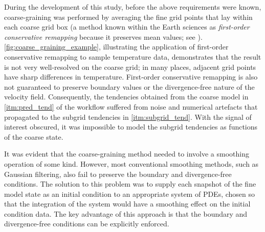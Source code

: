 \documentclass[../main.tex]{subfiles}
\begin{document}
During the development of this study, before the above requirements were known,
coarse-graining was performed by averaging the fine grid points that lay within
each coarse grid box (a method known within the Earth sciences as
\emph{first-order conservative remapping} because it preserves mean values; see
\cite{jones1999}). \cref{fig:coarse_graining_example}, illustrating the
application of first-order conservative remapping to sample temperature data,
demonstrates that the result is not very well-resolved on the coarse grid; in
many places, adjacent grid points have sharp differences in temperature.
First-order conservative remapping is also not guaranteed to preserve boundary
values or the divergence-free nature of the velocity field. Consequently, the
tendencies obtained from the coarse model in \cref{itm:pred_tend} of the
workflow suffered from noise and numerical artefacts that propagated to the
subgrid tendencies in \cref{itm:subgrid_tend}. With the signal of interest
obscured, it was impossible to model the subgrid tendencies as functions of the
coarse state.

It was evident that the coarse-graining method needed to involve a smoothing
operation of some kind. However, most conventional smoothing methods, such as
Gaussian filtering, also fail to preserve the boundary and divergence-free
conditions. The solution to this problem was to supply each snapshot of the
fine model state as an initial condition to an appropriate system of PDEs,
chosen so that the integration of the system would have a smoothing effect on
the initial condition data. The key advantage of this approach is that the
boundary and divergence-free conditions can be explicitly enforced.
\end{document}
